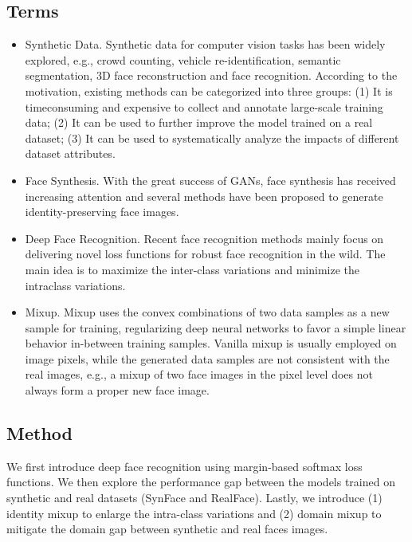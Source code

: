 \documentclass[12pt]{article}
\begin{document}
\subsection{Terms}
\begin{itemize}
  \item Synthetic Data. Synthetic data for computer vision
  tasks has been widely explored, e.g., crowd counting,
  vehicle re-identification, semantic segmentation, 3D face reconstruction and face recognition. According to the motivation, existing methods can be categorized into three groups: (1) It is timeconsuming and expensive to collect and annotate large-scale
  training data; (2) It can be used to further improve the model trained on a real dataset; (3) It can
  be used to systematically analyze the impacts of different
  dataset attributes.
  \item Face Synthesis. With the great success of GANs, face synthesis has received increasing
  attention and several methods have been proposed to generate identity-preserving face images.
  \item Deep Face Recognition. Recent face recognition methods mainly focus on delivering novel loss functions for
  robust face recognition in the wild. The main idea is to
  maximize the inter-class variations and minimize the intraclass variations. 
  \item Mixup. Mixup uses the convex combinations of
  two data samples as a new sample for training, regularizing deep neural networks to favor a simple linear behavior in-between training samples. Vanilla mixup is usually
  employed on image pixels, while the generated data samples are not consistent with the real images, e.g., a mixup
  of two face images in the pixel level does not always form
  a proper new face image. 
\end{itemize}
\subsection{Method}
We first introduce deep face recognition
using margin-based softmax loss functions. We then explore the performance gap between the models trained on
synthetic and real datasets (SynFace and RealFace). Lastly,
we introduce (1) identity mixup to enlarge the intra-class
variations and (2) domain mixup to mitigate the domain gap
between synthetic and real faces images.
\end{document}
